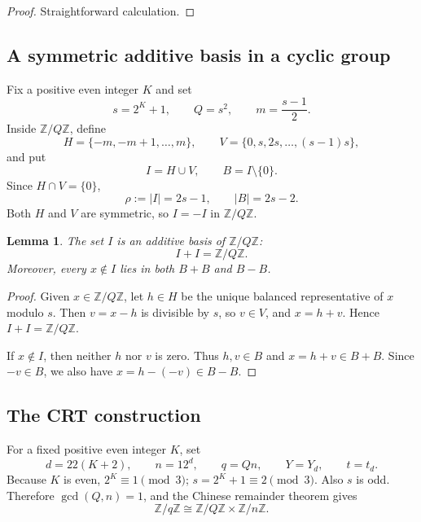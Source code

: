 \documentclass[11pt,reqno]{amsart}
\theoremstyle{plain}
\newtheorem{lemma}[theorem]{Lemma}
\theoremstyle{definition}
\theoremstyle{remark}
\theoremstyle{named}
\newcommand{\Z}{\mathbb Z}
\newcommand{\card}[1]{\lvert #1\rvert}
\begin{document}
\begin{proof}
Straightforward calculation.
\end{proof}

\subsection{A symmetric additive basis in a cyclic group}

Fix a positive even integer $K$ and set
\begin{equation}\label{eq:parameters1}
 s=2^K+1,
 \qquad
 Q=s^2,
 \qquad
 m=\frac{s-1}{2}.
\end{equation}
Inside $\Z/Q\Z$, define
\[
 H=\{-m,-m+1,\ldots,m\},
 \qquad
 V=\{0,s,2s,\ldots,(s-1)s\},
\]
and put
\[
 I=H\cup V,
 \qquad
 B=I\setminus\{0\}.
\]
Since $H\cap V=\{0\}$,
\begin{equation}\label{eq:I-size}
 \rho:=\card I=2s-1,
 \qquad
 \card B=2s-2.
\end{equation}
Both $H$ and $V$ are symmetric, so $I=-I$ in $\mathbb Z/Q\mathbb Z$.

\begin{lemma}\label{lem:outer-basis}
The set $I$ is an additive basis of $\Z/Q\Z$:
\[
 I+I=\Z/Q\Z.
\]
Moreover, every $x\notin I$ lies in both $B+B$ and $B-B$.
\end{lemma}

\begin{proof}
Given $x\in\Z/Q\Z$, let $h\in H$ be the unique balanced representative of
$x$ modulo $s$.  Then $v=x-h$ is divisible by $s$, so $v\in V$, and
$x=h+v$.  Hence $I+I=\Z/Q\Z$.

If $x\notin I$, then neither $h$ nor $v$ is zero.  Thus $h,v\in B$ and
$x=h+v\in B+B$.  Since $-v\in B$, we also have $x=h-(-v)\in B-B$.
\end{proof}

\subsection{The CRT construction}

For a fixed positive even integer $K$, set
\begin{equation}\label{eq:parameters2}
 d=22(K+2),
 \qquad
 n=12^d,
 \qquad
 q=Qn,
 \qquad
 Y=Y_d,
 \qquad
 t=t_d.
\end{equation}
Because $K$ is even, $2^K\equiv1\pmod3$; $s=2^K+1\equiv2\pmod3$. 
Also $s$ is odd.  Therefore $\gcd(Q,n)=1$, and the Chinese remainder theorem
gives
\[
 \Z/q\Z\cong \Z/Q\Z\times\Z/n\Z.
\]
\end{document}
